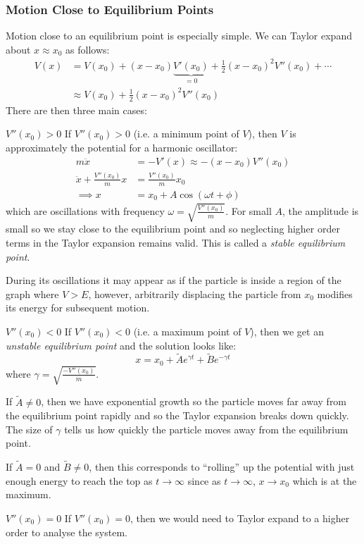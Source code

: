 \documentclass[../main.tex]{subfiles}
\begin{document}
\subsubsection{Motion Close to Equilibrium Points}
Motion close to an equilibrium point is especially simple.
We can Taylor expand about $x \approx x_0$ as follows:
\begin{align*}
  V(x) &= V(x_0) + (x - x_0)\underbrace{V'(x_0)}_{=0} + \frac{1}{2}(x - x_0)^2 V''(x_0) + \cdots \\
       &\approx V(x_0) + \frac{1}{2}(x - x_0)^2 V''(x_0)
\end{align*}
There are then three main cases:
\begin{proofcases}
  \begin{case}{$V''(x_0) > 0$}
    If $V''(x_0) > 0$ (i.e. a minimum point of $V$), then $V$ is approximately the potential for a harmonic oscillator:
    \begin{align*}
      m\ddot{x} &= - V'(x) \approx -(x - x_0)V''(x_0) \\
      \ddot{x} + \frac{V''(x_0)}{m} x &= \frac{V''(x_0)}{m} x_0 \\
      \implies x &= x_0 + A\cos(\omega t + \phi)
    \end{align*}
    which are oscillations with frequency $\omega = \sqrt{\frac{V''(x_0)}{m}}$.
    For small $A$, the amplitude is small so we stay close to the equilibrium point and so neglecting higher order terms in the Taylor expansion remains valid.
    This is called a \textit{stable equilibrium point}.
    \begin{remark}
      During its oscillations it may appear as if the particle is inside a region of the graph where $V > E$, however, arbitrarily displacing the particle from $x_0$ modifies its energy for subsequent motion.
    \end{remark}
  \end{case}
  \begin{case}{$V''(x_0) < 0$}
    If $V''(x_0) < 0$ (i.e. a maximum point of $V$), then we get an \textit{unstable equilibrium point} and the solution looks like:
    \[
      x = x_0 + \widetilde{A}e^{\gamma t} + \widetilde{B}e^{-\gamma t}
    \]
    where $\gamma = \sqrt{\frac{-V''(x_0)}{m}}$.

    If $\widetilde{A} \neq 0$, then we have exponential growth so the particle moves far away from the equilibrium point rapidly and so the Taylor expansion breaks down quickly.
    The size of $\gamma$ tells us how quickly the particle moves away from the equilibrium point.

    If $\widetilde{A} = 0$ and $\widetilde{B} \neq 0$, then this corresponds to ``rolling'' up the potential with just enough energy to reach the top as $t \to \infty$ since as $t \to \infty$, $x \to x_0$ which is at the maximum.
  \end{case}
  \begin{case}{$V''(x_0) = 0$}
    If $V''(x_0) = 0$, then we would need to Taylor expand to a higher order to analyse the system.
  \end{case}
\end{proofcases}
\end{document}
